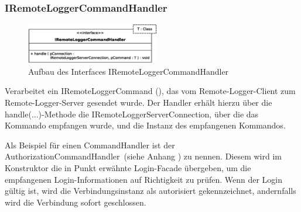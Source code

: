 \subsubsection{IRemoteLoggerCommandHandler}
\begin{figure}
	\vspace{-20px} \hspace{5px}
	\includegraphics[width=220px]{../img/CD-IRemoteLoggerCommandHandler.eps}
	\caption{Aufbau des Interfaces \glqq IRemoteLoggerCommandHandler\grqq}
\end{figure}
\par Verarbeitet ein IRemoteLoggerCommand (), das vom Remote-Logger-Client zum Remote-Logger-Server gesendet wurde. Der Handler erhält hierzu über die \glqq handle(...)\grqq-Methode die IRemoteLoggerServerConnection, über die das Kommando empfangen wurde, und die Instanz des empfangenen Kommandos.
\par Als Beispiel für einen CommandHandler ist der \glqq AuthorizationCommandHandler\grqq\ (siehe Anhang ) zu nennen. Diesem wird im Konstruktor die in Punkt  erwähnte Login-Facade übergeben, um die empfangenen Login-Informationen auf Richtigkeit zu prüfen. Wenn der Login gültig ist, wird die Verbindungsinstanz als autorisiert gekennzeichnet, andernfalls wird die Verbindung sofort geschlossen.
